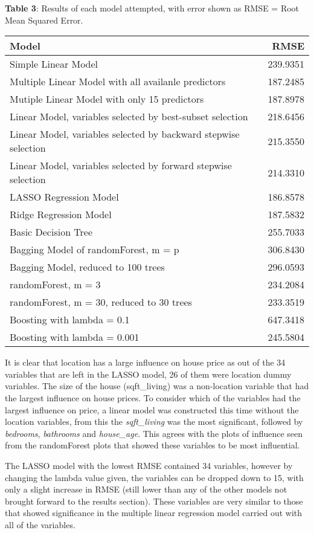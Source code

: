 \documentclass[
]{article}
\begin{document}
\textbf{Table 3}: Results of each model attempted, with error shown as
RMSE = Root Mean Squared Error.

\begin{tabular}{|>{\raggedright\arraybackslash}p{7cm}|>{}r|}
\hline
Model & RMSE\\
\hline
Simple Linear Model & 239.9351\\
\hline
Multiple Linear Model with all availanle predictors & 187.2485\\
\hline
Mutiple Linear Model with only 15 predictors & 187.8978\\
\hline
Linear Model, variables selected by best-subset selection & 218.6456\\
\hline
Linear Model, variables selected by backward stepwise selection & 215.3550\\
\hline
Linear Model, variables selected by forward stepwise selection & 214.3310\\
\hline
LASSO Regression Model & 186.8578\\
\hline
Ridge Regression Model & 187.5832\\
\hline
Basic Decision Tree & 255.7033\\
\hline
Bagging Model of randomForest, m = p & 306.8430\\
\hline
Bagging Model, reduced to 100 trees & 296.0593\\
\hline
randomForest, m = 3 & 234.2084\\
\hline
randomForest, m = 30, reduced to 30 trees & 233.3519\\
\hline
Boosting with lambda = 0.1 & 647.3418\\
\hline
Boosting with lambda = 0.001 & 245.5804\\
\hline
\end{tabular}

It is clear that location has a large influence on house price as out of
the 34 variables that are left in the LASSO model, 26 of them were
location dummy variables. The size of the house (sqft\_living) was a
non-location variable that had the largest influence on house prices. To
consider which of the variables had the largest influence on price, a
linear model was constructed this time without the location variables,
from this the \emph{sqft\_living} was the most significant, followed by
\emph{bedrooms}, \emph{bathrooms} and \emph{house\_age}. This agrees
with the plots of influence seen from the randomForest plots that showed
these variables to be most influential.

The LASSO model with the lowest RMSE contained 34 variables, however by
changing the lambda value given, the variables can be dropped down to
15, with only a slight increase in RMSE (still lower than any of the
other models not brought forward to the results section). These
variables are very similar to those that showed significance in the
multiple linear regression model carried out with all of the variables.
\end{document}
